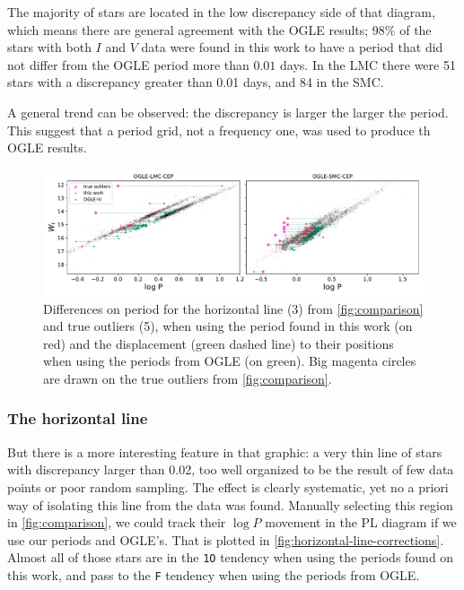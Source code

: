 The majority of stars are located in the low discrepancy side of that diagram, which means there are general agreement with the OGLE results;
98\% of the stars with both $I$ and $V$ data were found in this work to have a period that did not differ from the OGLE period more than $0.01$ days.
In the LMC there were 51 stars with a discrepancy greater than 0.01 days, and 84 in the SMC.

A general trend can be observed: the discrepancy is larger the larger the period.
This suggest that a period grid, not a frequency one, was used to produce th OGLE results.

\begin{figure}
	\centering
	\includegraphics[width=\textwidth]{img/horizontal_line_corrections.pdf}
	\caption[Results: comparison with OGLE-IV periods]{
		Differences on period for the horizontal line (3) from \autoref{fig:comparison} and true outliers (5), when using the period found in this work (on red)
		and the displacement  (green dashed line) to their positions when using the periods from OGLE (on green).
		Big magenta circles are drawn on the true outliers from  \autoref{fig:comparison}.
	}
	\label{fig:horizontal-line-corrections}
\end{figure}

\subsubsection{The horizontal line}

But there is a more interesting feature in that graphic: a very thin line of stars with discrepancy larger than 0.02, 
too well organized to be the result of few data points or poor random sampling.
The effect is clearly systematic, yet no a priori way of isolating this line from the data was found.
Manually selecting this region in \autoref{fig:comparison}, 
we could track their $\log P$ movement in the PL diagram if we use our periods and OGLE's.
That is plotted in \autoref{fig:horizontal-line-corrections}.
Almost all of those stars are in the \texttt{1O} tendency when using the periods found on this work,
and pass to the \texttt{F} tendency when using the periods from OGLE. 

